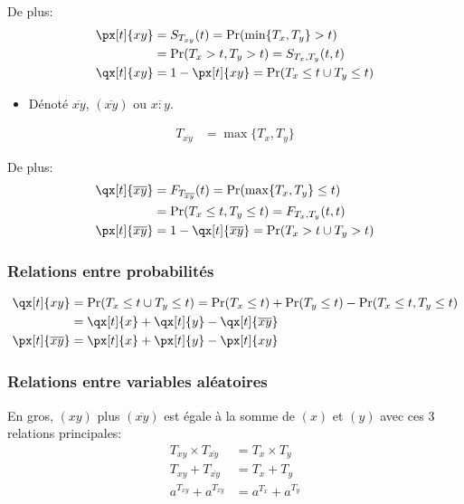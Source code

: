 \documentclass[10pt, french]{article}
\begin{document}
\begin{multicols*}{2}
\begin{definitionNOHFILLsub}
De plus:
\begin{align*}
	\px[t]{xy}
	&=	S_{T_{xy}}(t)
	=	\Pr(\min\{T_{x}, T_{y}\}	>	t)	\\
	&=	\Pr(T_{x} > t, T_{y}	>	t)	
	=	S_{T_{x}, T_{y}}(t, t)	\\
	\qx[t]{xy}
	&=	1 - \px[t]{xy}
	=	\Pr(T_{x} \leq t \cup T_{y}	\leq	t)	
\end{align*}
\end{definitionNOHFILLsub}

\begin{definitionNOHFILLsub}
\begin{itemize}[leftmargin = *]
	\item	Dénoté $\overline{xy}$, $(\overline{xy})$ ou $\overline{x : y}$.
\end{itemize}
\begin{align*}
	T_{\overline{xy}}
	&=	\max\{T_{x}, T_{y}\}	
\end{align*}

De plus:
\begin{align*}
	\qx[t]{\overline{xy}}
	&=	F_{T_{\overline{xy}}}(t)
	=	\Pr(\max\{T_{x}, T_{y}\}	\leq	t)	\\
	&=	\Pr(T_{x} \leq t, T_{y}	\leq	t)	
	=	F_{T_{x}, T_{y}}(t, t)	\\
	\px[t]{\overline{xy}}
	&=	1 - \qx[t]{\overline{xy}}
	=	\Pr(T_{x} > t \cup T_{y}	>	t)	
\end{align*}
\end{definitionNOHFILLsub}

\subsubsection*{Relations entre probabilités}
\begin{align*}
	\qx[t]{xy}
	&=	\Pr(T_{x} \leq t \cup T_{y}	\leq	t)	
	=	\Pr(T_{x} \leq t) + \Pr(T_{y}	\leq	t)	 - \Pr(T_{x} \leq t, T_{y}	\leq	t)	\\
	&=	\qx[t]{x} + \qx[t]{y} - \qx[t]{\overline{xy}}	\\
	\px[t]{\overline{xy}}
	&=	\px[t]{x} + \px[t]{y} - \px[t]{xy}	\\
\end{align*}

\subsubsection*{Relations entre variables aléatoires}
En gros, $(xy)$ plus $(\overline{xy})$ est égale à la somme de $(x)$ et $(y)$ avec ces 3 relations principales:
\begin{align*}
	T_{xy} \times T_{\overline{xy}}
	&=	T_{x} \times T_{y}	\\
	T_{xy} + T_{\overline{xy}}
	&=	T_{x} + T_{y}	\\
	a^{T_{xy}} + a^{T_{\overline{xy}}}
	&=	a^{T_{x}} + a^{T_{y}}	\\
\end{align*}


\end{multicols*}
\end{document}
